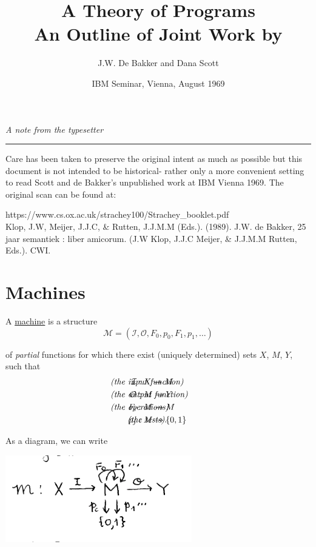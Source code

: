 \documentclass{article}
\title{A Theory of Programs \\ 

\large{
    An Outline of Joint Work by
}}
\author{J.W. De Bakker and Dana Scott}
\date{IBM Seminar, Vienna, August 1969}
\newcommand{\scM}{\mathscr{M}}
\newcommand{\mcI}{\mathcal{I}}
\newcommand{\mcO}{\mathcal{O}}
\begin{document}
\begin{center}
    \large{\textit{A note from the typesetter}} \\
    \hrule
\end{center}

Care has been taken to preserve the original intent as much as possible but this document is not intended to be historical- rather only a more convenient setting to read  Scott and de Bakker's unpublished work at IBM Vienna 1969. The original scan can be found at: 

\begin{framed}
https://www.cs.ox.ac.uk/strachey100/Strachey\_booklet.pdf \\

Klop, J.W, Meijer, J.J.C, \& Rutten, J.J.M.M (Eds.). (1989). J.W. de Bakker, 25 jaar semantiek : liber amicorum. (J.W Klop, J.J.C Meijer, \& J.J.M.M Rutten, Eds.). CWI.
\end{framed}


\maketitle

\section{Machines}

A \underline{machine} is a structure 
\begin{equation*}
    \scM = (\mcI, \mcO, F_0, p_0, F_1, p_1, \ldots)
\end{equation*}

of \textit{partial} functions for which there exist (uniquely determined) sets $X$, $M$, $Y$, such that 
\begin{align*}
    \mcI & : X \to M && \hspace{-100pt} \textrm{\textit{(the input function)}} \\
    \mcO & : M \to Y && \hspace{-100pt}\textrm{\textit{(the output function)}} \\
    F_i & : M \to M && \hspace{-100pt}\textrm{\textit{(the operations)}} \\
    p_j & : M \to \{0, 1\} && \hspace{-80pt}\textrm{\textit{(the tests)}}. \\
\end{align*}

As a diagram, we can write
\begin{center}
    \includegraphics[width=230pt]{dg1.png}
\end{center}
\end{document}
